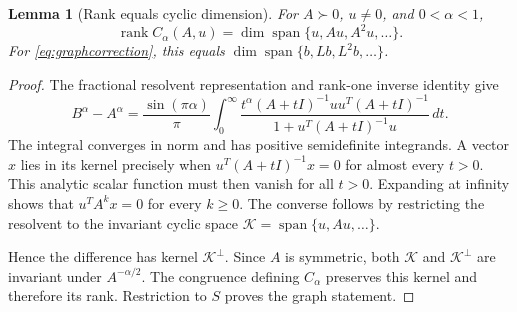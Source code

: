 \documentclass[11pt]{article}
\newtheorem{lemma}[theorem]{Lemma}
\newcommand{\rank}{\operatorname{rank}}
\newcommand{\spanof}{\operatorname{span}}
\begin{document}
\begin{lemma}[Rank equals cyclic dimension]\label{lem:rank}
For $A\succ0$, $u\ne0$, and $0<\alpha<1$,
\[
 \rank C_\alpha(A,u)
   =\dim\spanof\{u,Au,A^2u,\ldots\}.
\]
For \eqref{eq:graphcorrection}, this equals
$\dim\spanof\{b,Lb,L^2b,\ldots\}$.
\end{lemma}
\begin{proof}
The fractional resolvent representation and rank-one inverse identity
give
\begin{equation}\label{eq:resolvent}
 B^\alpha-A^\alpha
 =\frac{\sin(\pi\alpha)}\pi\int_0^\infty
 \frac{t^\alpha(A+tI)^{-1}uu^T(A+tI)^{-1}}
      {1+u^T(A+tI)^{-1}u}\,dt.
\end{equation}
The integral converges in norm and has positive semidefinite integrands.
A vector $x$ lies in its kernel precisely when
$u^T(A+tI)^{-1}x=0$ for almost every $t>0$. This analytic scalar
function must then vanish for all $t>0$. Expanding at infinity shows
that $u^TA^kx=0$ for every $k\ge0$. The converse follows by restricting
the resolvent to the invariant cyclic space
$\mathcal K=\spanof\{u,Au,\ldots\}$.

Hence the difference has kernel $\mathcal K^\perp$. Since $A$ is
symmetric, both $\mathcal K$ and $\mathcal K^\perp$ are invariant under
$A^{-\alpha/2}$. The congruence defining $C_\alpha$ preserves this
kernel and therefore its rank. Restriction to $S$ proves the graph
statement.
\end{proof}
\end{document}
